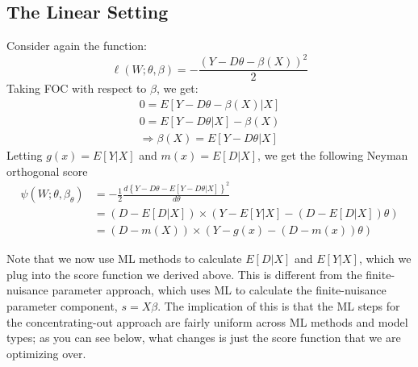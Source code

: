 \documentclass[11pt]{article}
\begin{document}
\subsection{The Linear Setting}
Consider again the function:
$$\ell(W ; \theta, \beta)=-\frac{(Y-D \theta-\beta(X))^{2}}{2}$$
Taking FOC with respect to $\beta$, we get:
\begin{align*}
	0 = E[Y - D\theta - \beta(X)| X] \\
  0 = E[Y- D\theta|X] - \beta(X) \\
	\Rightarrow \beta(X) = E[Y - D\theta |X]
\end{align*}
Letting $g(x) = E[Y|X]$ and $m(x) = E[D|X]$, we get the following Neyman orthogonal score
\begin{align*}
	\psi\left(W ; \theta, \beta_{\theta}\right) &=-\frac{1}{2} \frac{d\left\{Y-D \theta-E[Y-D \theta | X]\right\}^{2}}{d \theta} \\
	&=\left(D-E[D | X]\right) \times\left(Y-E[Y | X]-\left(D-E[D | X]\right) \theta\right) \\
	&=\left(D-m(X)\right) \times\left(Y- g(x) - (D - m(x) )\theta\right)
\end{align*}

Note that we now use ML methods to calculate $E[D|X]$ and $E[Y|X]$, which we plug into the score function we derived above. This is different from the finite-nuisance parameter approach, which uses ML to calculate the finite-nuisance parameter component, $s = X\beta$. The implication of this is that the ML steps for the concentrating-out approach are fairly uniform across ML methods and model types; as you can see below, what changes is just the score function that we are optimizing over.
\end{document}
